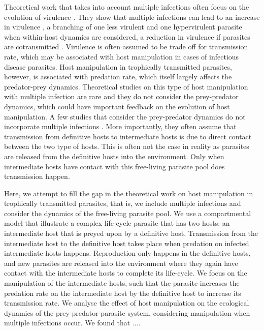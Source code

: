 \documentclass[11pt]{article}
\begin{document}
Theoretical work that takes into account multiple infections often focus on the evolution of virulence \citep{vanBaalen1995, Alizon2013, Alizon2008, Choisy2010, Alizon2012}. They show that multiple infections can lead to an increase in virulence \citep{vanBaalen1995, Choisy2010}, a branching of one less virulent and one hypervirulent parasite when within-host dynamics are considered, a reduction in virulence if parasites are cotransmitted \citep{Alizon2012}. Virulence is often assumed to be trade off for transmission rate, which may be associated with host manipulation in cases of infectious disease parasites. Host manipulation in trophically transmitted parasites, however, is associated with predation rate, which itself largely affects the predator-prey dynamics. Theoretical studies on this type of host manipulation with multiple infection are rare \citep{Parker2003,Vickery2009} and they do not consider the prey-predator dynamics, which could have important feedback on the evolution of host manipulation. A few studies that consider the prey-predator dynamics do not incorporate multiple infections \citep{Rogawa2018, Iritani2018, Hadeler1989, Fenton2006}. More importantly, they often assume that transmission from definitive hosts to intermediate hosts is due to direct contact between the two type of hosts. This is often not the case in reality as parasites are released from the definitive hosts into the environment. Only when intermediate hosts have contact with this free-living parasite pool does transmission happen.


Here, we attempt to fill the gap in the theoretical work on host manipulation in trophically transmitted parasites, that is, we include multiple infections and consider the dynamics of the free-living parasite pool. We use a compartmental model that illustrate a complex life-cycle parasite that has two hosts: an intermediate host that is preyed upon by a definitive host. Transmission from the intermediate host to the definitive host takes place when predation on infected intermediate hosts happens. Reproduction only happens in the definitive hosts, and new parasites are released into the environment where they again have contact with the intermediate hosts to complete its life-cycle. We focus on the manipulation of the intermediate hosts, such that the parasite increases the predation rate on the intermediate host by the definitive host to increase its transmission rate. We analyse the effect of host manipulation on the ecological dynamics of the prey-predator-parasite system, considering manipulation when multiple infections occur. We found that ....
\end{document}

